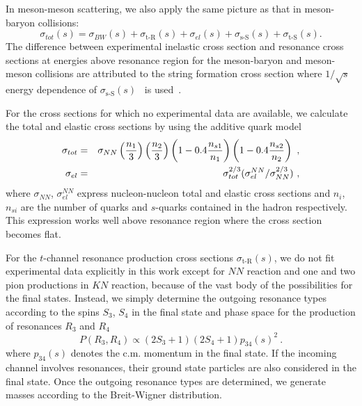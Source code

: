 \documentclass[]{article}
\newcommand{\srt}{\mbox{$\sqrt{s}$}}
\newcommand{\sigtot}{\mbox{$\sigma_{tot}(s)$}}
\newcommand{\sigel}{\mbox{$\sigma_{el}(s)$}}
\newcommand{\sigtR}{\mbox{$\sigma_{\mbox{t-R}}(s)$}}
\newcommand{\sigtS}{\mbox{$\sigma_{\mbox{t-S}}(s)$}}
\newcommand{\sigbw}{\mbox{$\sigma_{BW}(s)$}}
\newcommand{\sigsS}{\mbox{$\sigma_{\mbox{s-S}}(s)$}}
\begin{document}
In meson-meson scattering,
 we also apply the same picture as that in meson-baryon collisions:
\begin{equation}
 \sigtot=\sigbw + \sigtR + \sigel + \sigsS + \sigtS.
\end{equation}
%
%
%
%
The difference between experimental inelastic cross section
and resonance cross sections at energies above resonance region
for the meson-baryon and meson-meson collisions
are attributed to the string formation cross section
where $1/\srt$ energy dependence of \sigsS~ is used~\cite{rqmd2}.

For the cross sections for which no experimental data are available,
we calculate the total and elastic cross sections by using the
additive quark model~\cite{rqmd1,urqmd,goulianos}
\begin{eqnarray}
  \sigma_{tot} &=& \sigma_{NN}\left({n_{1}\over3}\right)\left({n_2\over3}\right)
                 \left(1-0.4{n_{s1}\over n_1}\right)
                 \left(1-0.4{n_{s2}\over n_2}\right) ~, \\
  \sigma_{el} &=& \sigma_{tot}^{2/3}
               (\sigma_{el}^{NN}/ \sigma_{NN}^{2/3}) ~,
\end{eqnarray}
where $\sigma_{NN}$, $\sigma_{el}^{NN}$ express nucleon-nucleon total
and elastic cross sections and $n_i$,$n_{si}$ are the 
number of quarks and $s$-quarks contained in the hadron respectively.
This expression works well above resonance region where the cross section
becomes flat.

For the $t$-channel resonance production cross sections \sigtR,
we do not fit experimental data explicitly in this work
except for $NN$ reaction and one and two pion productions in $KN$ reaction,
because of the vast body of the possibilities for the final states.
 Instead, we simply determine the outgoing resonance types
according to the spins $S_3$, $S_4$ in the final state  and phase space
for the production of resonances $R_3$ and $R_4$
\begin{equation}
 P(R_3,R_4) \propto (2S_3+1)(2S_4+1)p_{34}(s)^2 ~.
\end{equation}
where $p_{34}(s)$ denotes the c.m. momentum in the final state.
If the incoming channel involves resonances, their ground state
particles are also considered in the final state.
Once the outgoing resonance types are determined,
we generate masses according to the Breit-Wigner distribution.
\end{document}
